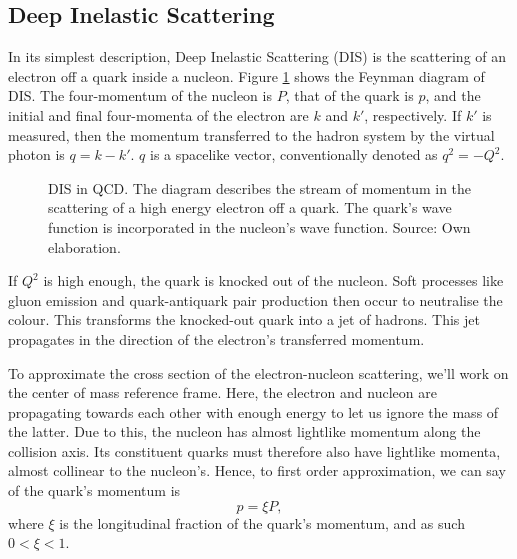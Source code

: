 \subsection{Deep Inelastic Scattering} \label{sec::dis}
    In its simplest description, Deep Inelastic Scattering (DIS) is the scattering of an electron off a quark inside a nucleon.
    Figure \ref{fig::dis_diagram} shows the Feynman diagram of DIS.
    The four-momentum of the nucleon is $P$, that of the quark is $p$, and the initial and final four-momenta of the electron are $k$ and $k'$, respectively.
    If $k'$ is measured, then the momentum transferred to the hadron system by the virtual photon is $q = k - k'$.
    $q$ is a spacelike vector, conventionally denoted as $q^2 = -Q^2$.
    
    \begin{figure}[h!]
        \centering{}
        \caption[DIS in QCD.]{DIS in QCD. The diagram describes the stream of momentum in the scattering of a high energy electron off a quark. The quark's wave function is incorporated in the nucleon's wave function. Source: Own elaboration.}
        \label{fig::dis_diagram}
    \end{figure}

    If $Q^2$ is high enough, the quark is knocked out of the nucleon.
    Soft processes like gluon emission and quark-antiquark pair production then occur to neutralise the colour.
    This transforms the knocked-out quark into a jet of hadrons.
    This jet propagates in the direction of the electron's transferred momentum.

    To approximate the cross section of the electron-nucleon scattering, we'll work on the center of mass reference frame.
    Here, the electron and nucleon are propagating towards each other with enough energy to let us ignore the mass of the latter.
    Due to this, the nucleon has almost lightlike momentum along the collision axis.
    Its constituent quarks must therefore also have lightlike momenta, almost collinear to the nucleon's.
    Hence, to first order approximation, we can say of the quark's momentum is
    \begin{equation*}
        p = \xi P,
    \end{equation*}
    where $\xi$ is the longitudinal fraction of the quark's momentum, and as such $0 < \xi < 1$.

